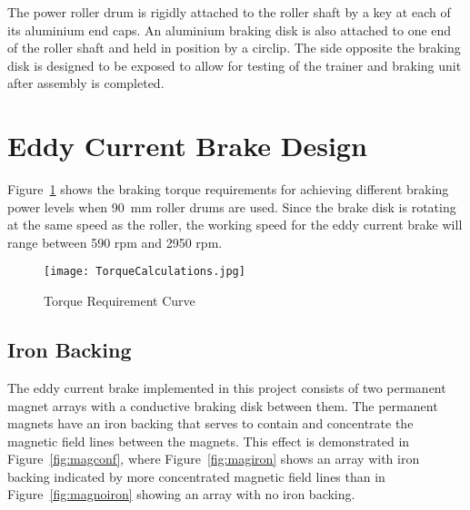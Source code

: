 The power roller drum is rigidly attached to the roller shaft by a key at each of its aluminium end caps. An aluminium braking disk is also attached to one end of the roller shaft and held in position by a circlip. The side opposite the braking disk is designed to be exposed to allow for testing of the trainer and braking unit after assembly is completed.


\section{Eddy Current Brake Design}
\label{sec:Eddy}


Figure~\ref{fig:torqueCalc} shows the braking torque requirements for achieving different braking power levels when \SI{90}{\milli\meter} roller drums are used. Since the brake disk is rotating at the same speed as the roller, the working speed for the eddy current brake will range between 590 \ac{rpm} and 2950 \ac{rpm}.

\begin{figure}[H]
	\begin{center}
		\texttt{[image: TorqueCalculations.jpg]}
		\caption{Torque Requirement Curve}
		\label{fig:torqueCalc}
	\end{center}
\end{figure}

\vspace{-0.9cm}

\subsection{Iron Backing}

The eddy current brake implemented in this project consists of two permanent magnet arrays with a conductive braking disk between them. The permanent magnets have an iron backing that serves to contain and concentrate the magnetic field lines between the magnets. This effect is demonstrated in Figure~\ref{fig:magconf}, where Figure~\ref{fig:magiron} shows an array with iron backing indicated by more concentrated magnetic field lines than in Figure~\ref{fig:magnoiron} showing an array with no iron backing. 


